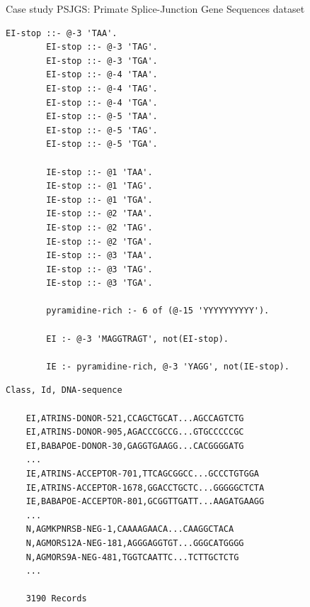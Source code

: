 \documentclass[presentation]{beamer}\mode<presentation>{\usetheme{AMSBolognaFC}}
\begin{document}
\begin{frame}{Case study}
    PSJGS: Primate Splice-Junction Gene Sequences dataset
    \begin{minipage}{0.5\textwidth}
        \begin{lstlisting}[language={}, basicstyle=\ttfamily\tiny,frame=none]
        EI-stop ::- @-3 'TAA'.
        EI-stop ::- @-3 'TAG'.
        EI-stop ::- @-3 'TGA'.
        EI-stop ::- @-4 'TAA'.
        EI-stop ::- @-4 'TAG'.
        EI-stop ::- @-4 'TGA'.
        EI-stop ::- @-5 'TAA'.
        EI-stop ::- @-5 'TAG'.
        EI-stop ::- @-5 'TGA'.
        
        IE-stop ::- @1 'TAA'.
        IE-stop ::- @1 'TAG'.
        IE-stop ::- @1 'TGA'.
        IE-stop ::- @2 'TAA'.
        IE-stop ::- @2 'TAG'.
        IE-stop ::- @2 'TGA'.
        IE-stop ::- @3 'TAA'.
        IE-stop ::- @3 'TAG'.
        IE-stop ::- @3 'TGA'.
        
        pyramidine-rich :- 6 of (@-15 'YYYYYYYYYY').
        
        EI :- @-3 'MAGGTRAGT', not(EI-stop).
        
        IE :- pyramidine-rich, @-3 'YAGG', not(IE-stop).
        \end{lstlisting}
    \end{minipage}
    \vline
    \begin{minipage}{0.45\textwidth}
        \begin{lstlisting}[language={}, basicstyle=\ttfamily\tiny,frame=none]           
    Class, Id, DNA-sequence
    
    EI,ATRINS-DONOR-521,CCAGCTGCAT...AGCCAGTCTG
    EI,ATRINS-DONOR-905,AGACCCGCCG...GTGCCCCCGC
    EI,BABAPOE-DONOR-30,GAGGTGAAGG...CACGGGGATG
    ...
    IE,ATRINS-ACCEPTOR-701,TTCAGCGGCC...GCCCTGTGGA
    IE,ATRINS-ACCEPTOR-1678,GGACCTGCTC...GGGGGCTCTA
    IE,BABAPOE-ACCEPTOR-801,GCGGTTGATT...AAGATGAAGG
    ...
    N,AGMKPNRSB-NEG-1,CAAAAGAACA...CAAGGCTACA
    N,AGMORS12A-NEG-181,AGGGAGGTGT...GGGCATGGGG
    N,AGMORS9A-NEG-481,TGGTCAATTC...TCTTGCTCTG
    ...
    
    3190 Records
        \end{lstlisting}
    \end{minipage}
    
    \framebreak
    
    
    
    \framebreak
    

\end{frame}
\end{document}
